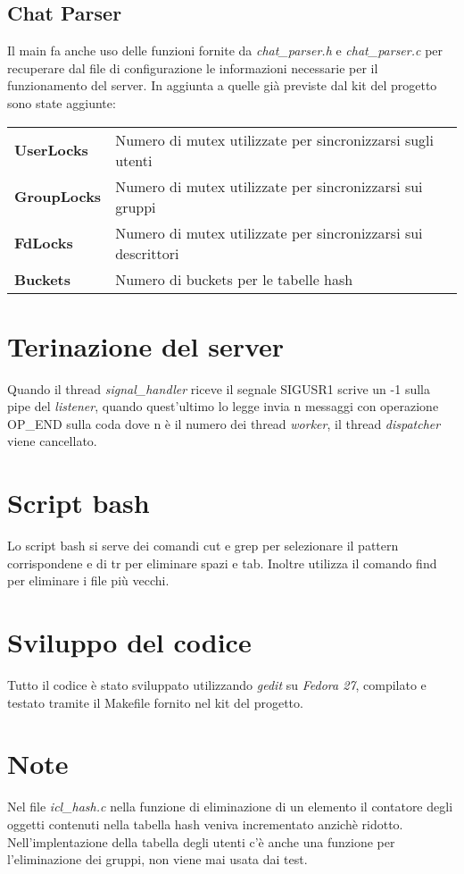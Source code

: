 \documentclass[11pt]{article}
\begin{document}
\subsection{Chat Parser}
Il main fa anche uso delle funzioni fornite da \emph{chat\_parser.h} e \emph{chat\_parser.c} per recuperare dal file di configurazione le informazioni necessarie per il funzionamento del server. In aggiunta a quelle già previste dal kit del progetto sono state aggiunte:

\begin{tabular}{ll}
	\textbf{UserLocks} & Numero di mutex utilizzate per sincronizzarsi sugli utenti\\
	\textbf{GroupLocks} & Numero di mutex utilizzate per sincronizzarsi sui gruppi\\
	\textbf{FdLocks} & Numero di mutex utilizzate per sincronizzarsi sui descrittori\\
	\textbf{Buckets} & Numero di buckets per le tabelle hash\\
\end{tabular}

\section{Terinazione del server}
Quando il thread \emph{signal\_handler} riceve il segnale SIGUSR1 scrive un -1 sulla pipe del \emph{listener}, quando quest'ultimo lo legge invia n messaggi con operazione OP\_END sulla coda dove n è il numero dei thread \emph{worker}, il thread \emph{dispatcher} viene cancellato.


\section{Script bash}
Lo script bash si serve dei comandi cut e grep per selezionare il pattern corrispondene e di tr per eliminare spazi e tab. Inoltre utilizza il comando find per eliminare i file più vecchi.
\section{Sviluppo del codice}
Tutto il codice è stato sviluppato utilizzando \emph{gedit} su \emph{Fedora 27}, compilato e testato tramite il Makefile fornito nel kit del progetto.
\section{Note}
Nel file \emph{icl\_hash.c} nella funzione di eliminazione di un elemento il contatore degli oggetti contenuti nella tabella hash veniva incrementato anzichè ridotto.
Nell'implentazione della tabella degli utenti c'è anche una funzione per l'eliminazione dei gruppi, non viene mai usata dai test.
\end{document}
